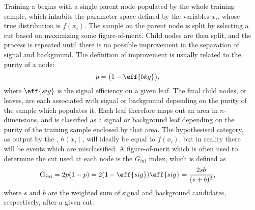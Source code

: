 Training a \DT begins with a single parent node populated by the whole
training sample, which inhabits the parameter space defined by the
variables $x_i$, whose true distribution is $f(x_i)$.
The sample on the parent node is split by selecting a cut based on maximizing some figure-of-merit.
Child nodes are then split, and the process is repeated
until there is no possible improvement in the separation of signal and background.
The definition of improvement is usually related to the purity of a node:
\begin{equation}
  p = \big(1-\eff{bkg}\big),
\end{equation}
where $\eff{sig}$ is the signal efficiency on a given leaf.
The final child nodes, or leaves, are each associated with signal or background depending on the
purity of the sample which populates it.
Each leaf therefore maps out an area in $n$-dimensions, and is classified as a signal or background
leaf
depending on the purity of the training sample enclosed by that area.
The hypothesised category, as output by the \DT, $h(x_i)$, will ideally be equal to $f(x_i)$, but in reality there will be
events which are misclassified.
A figure-of-merit which is often used to determine the cut used at each node is the $G_{ini}$
index, which is defined as
\begin{equation}
  \mathrm{G}_{ini} = 2p(1-p)
  = 2(1-\eff{sig})\eff{sig}
  = \frac{2sb}{(s+b)^2},
\end{equation}
where $s$ and $b$ are the weighted sum of signal and background candidates, respectively, after a
given cut.

